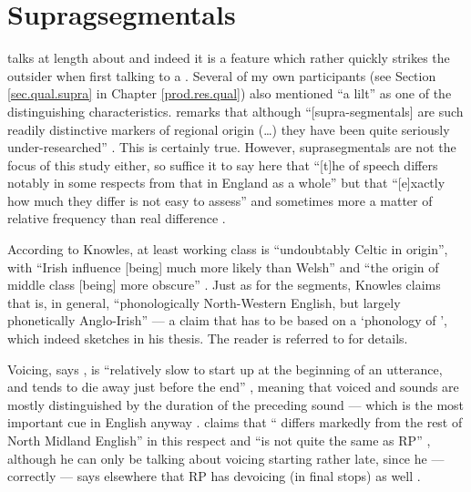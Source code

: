 	\section{Supragsegmentals}\label{sec.var.supra}

\citet{knowles1973} talks at length about   and indeed it is a feature which rather quickly strikes the outsider when first talking to a .
Several of my own participants (see Section \ref{sec.qual.supra} in Chapter \ref{prod.res.qual}) also mentioned ``a lilt'' as one of the distinguishing characteristics.
\citeauthor{wales2006} remarks that although ``[supra-segmentals] are such readily distinctive markers of regional origin (\ldots) they have been quite seriously under-researched'' \citeyearpar[201]{wales2006}.
This is certainly true.
However, suprasegmentals are not the focus of this study either, so suffice it to say here that ``[t]he  of  speech differs notably in some respects from that in England as a whole'' but that ``[e]xactly how much they differ is not easy to assess'' \citep[221]{knowles1973} and sometimes more a matter of relative frequency than real difference \citep[cf.][176]{knowles1973}.

According to Knowles, at least working class  is ``undoubtably Celtic in origin'', with ``Irish influence [being] much more likely than Welsh'' \citep[221--222]{knowles1973} and ``the origin of middle class   [being] more obscure'' \citep[222--223]{knowles1973}.
Just as for the segments, Knowles claims that   is, in general, ``phonologically North-Western English, but largely phonetically Anglo-Irish'' \citep[225]{knowles1973} --- a claim that has to be based on a `phonology of ', which indeed \citeauthor{knowles1973} sketches in his thesis.
The reader is referred to \citet[174--226]{knowles1973} for details.

Voicing, says \citeauthor{knowles1973}, is ``relatively slow to start up at the beginning of an utterance, and tends to die away just before the end'' \citeyearpar[246]{knowles1973}, meaning that voiced and  sounds are mostly distinguished by the duration of the preceding sound --- which is the most important cue in English anyway \citep[cf., for instance,][]{hoganrozsypal1980}. \citeauthor{knowles1973} claims that `` differs markedly from the rest of North Midland English'' in this respect and ``is not quite the same as RP'' \citeyearpar[246]{knowles1973}, although he can only be talking about voicing starting rather late, since he --- correctly --- says elsewhere that RP has devoicing (in final stops) as well \citeyearpar[cf.][114]{knowles1973}.

